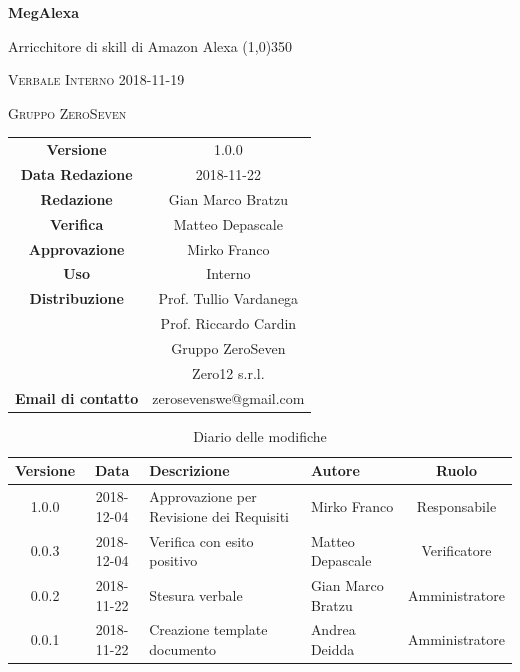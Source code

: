 \documentclass[a4paper,12pt]{article}
\author{Mirko Franco}
\date{2018-11-22}
\begin{document}
\begin{titlepage}
	\centering
	{\huge\bfseries MegAlexa\par}
	Arricchitore di skill di Amazon Alexa
	\line(1,0){350} \\
	{\scshape\LARGE Verbale Interno 2018-11-19 \par}
	\vspace{1cm}
	{\scshape Gruppo ZeroSeven \par}
	\logo
	\begin{tabular}{c|c}
		{\hfill \textbf{Versione}} 			& 1.0.0				\\
		{\hfill\textbf{Data Redazione}} 	& 2018-11-22		\\ 
		{\hfill\textbf{Redazione}} 			&  		Gian Marco Bratzu			\\ 
		{\hfill\textbf{Verifica}} 				&  		Matteo Depascale		\\ 
		{\hfill\textbf{Approvazione}} 		&  		Mirko Franco	\\ 
		{\hfill\textbf{Uso}} 					& 	Interno	\\ 
		{\hfill\textbf{Distribuzione}} 			& 			Prof. Tullio Vardanega \\ & Prof. Riccardo Cardin \\ & Gruppo ZeroSeven		\\ & Zero12 s.r.l. \\
		{\hfill\textbf{Email di contatto}} & zerosevenswe@gmail.com \\
	\end{tabular}
\end{titlepage}
	

	
	\label{LastFrontPage}
	

	\newpage
	\cleardoublepage
	\begin{table}[tbph]
		\centering
		\begin{tabularx}{\textwidth}{|c|c|X|X|c|}
			\hline
			\textbf{Versione} & \textbf{Data} & \textbf{Descrizione} & \textbf{Autore} & \textbf{Ruolo} \\
			\hline
			1.0.0 & 2018-12-04 & Approvazione per Revisione dei Requisiti & Mirko Franco &  Responsabile \\
			\hline
			0.0.3 & 2018-12-04 & Verifica con esito positivo & Matteo Depascale & Verificatore \\
			\hline
			0.0.2 & 2018-11-22 & Stesura verbale & Gian Marco Bratzu & Amministratore \\
			\hline
			0.0.1 & 2018-11-22 & Creazione template documento & Andrea Deidda & Amministratore\\
			\hline
		\end{tabularx}
		\caption{Diario delle modifiche}
	\end{table}
	
\end{document}
